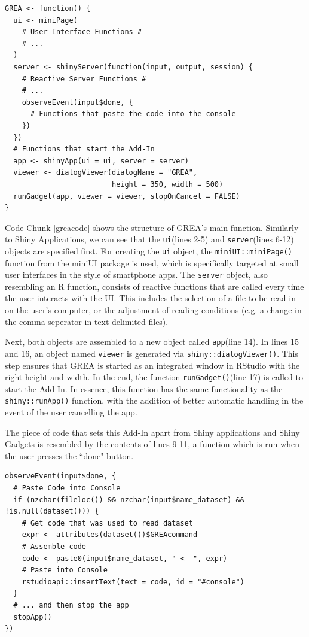 \documentclass[12pt]{article} %
\newcommand{\li}{\lstinline}
\begin{document}
\begin{lstlisting}[caption = Structure of the \li{GREA()} function, label = greacode]
GREA <- function() {
  ui <- miniPage(
    # User Interface Functions #
    # ...
  )
  server <- shinyServer(function(input, output, session) {
    # Reactive Server Functions #
    # ...
    observeEvent(input$done, {
      # Functions that paste the code into the console
    })
  })
  # Functions that start the Add-In
  app <- shinyApp(ui = ui, server = server)
  viewer <- dialogViewer(dialogName = "GREA", 
                         height = 350, width = 500)
  runGadget(app, viewer = viewer, stopOnCancel = FALSE)
}
\end{lstlisting}

Code-Chunk \ref{greacode} shows the structure of GREA's main function. Similarly to Shiny Applications, we can see that the \li{ui}(lines 2-5) and \li{server}(lines 6-12) objects are specified first. For creating the \li{ui} object, the \li{miniUI::miniPage()} function from the miniUI package \cite[Cheng 2016]{w4} is used, which is specifically targeted at small user interfaces in the style of smartphone apps. The \li{server} object, also resembling an R function, consists of reactive functions that are called every time the user interacts with the UI. This includes the selection of a file to be read in on the user's computer, or the adjustment of reading conditions (e.g. a change in the comma seperator in text-delimited files).

Next, both objects are assembled to a new object called \li{app}(line 14). In lines 15 and 16, an object named \li{viewer} is generated via \li{shiny::dialogViewer()}. This step ensures that GREA is started as an integrated window in RStudio with the right height and width. In the end, the function \li{runGadget()}(line 17) is called to start the Add-In. In essence, this function has the same functionality as the \li{shiny::runApp()} function, with the addition of better automatic handling in the event of the user cancelling the app.

The piece of code that sets this Add-In apart from Shiny applications and Shiny Gadgets is resembled by the contents of lines 9-11, a function which is run when the user presses the ``done" button.

\begin{lstlisting}[caption = Contents of reactive function for ``Done"-event, label = doneeventcode]
observeEvent(input$done, {
  # Paste Code into Console
  if (nzchar(fileloc()) && nzchar(input$name_dataset) && !is.null(dataset())) {
    # Get code that was used to read dataset
    expr <- attributes(dataset())$GREAcommand
    # Assemble code
    code <- paste0(input$name_dataset, " <- ", expr)
    # Paste into Console
    rstudioapi::insertText(text = code, id = "#console")
  }
  # ... and then stop the app
  stopApp()
})
\end{lstlisting}
\end{document}
